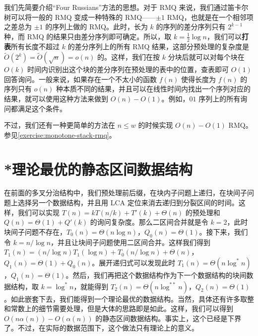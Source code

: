 我们先简要介绍“Four Russians”方法的思想。对于 RMQ 来说，我们通过笛卡尔树可以将一般的 RMQ 变成一种特殊的 RMQ——$\pm 1$ RMQ，也就是在一个相邻项之差总为 $\pm 1$ 的序列上做的 RMQ。此时，长为 $k$ 的序列的差分序列只有 $2^{k-1}$ 种，而 RMQ 的结果只由差分序列即可确定。所以，取 $k=\frac{1}{2}\log n$，我们可以\textbf{打表}所有长度不超过 $k$ 的差分序列上的所有 RMQ 结果，这部分预处理的复杂度是 $\tilde O(2^k)=\tilde O(\sqrt{n})=o(n)$ 的。这样，我们在按 $k$ 分块后就可以对每个块在 $O(k)$ 时间内识别出这个块的差分序列在预处理的表中的位置，查表即可 $O(1)$ 回答询问。一般来说，如果存在一个不太小的函数 $f(n)$ 使得长度为 $f(n)$ 的序列只有 $o(n)$ 种本质不同的结果，并且可以在线性时间内找出一个序列对应的结果，就可以使用这种方法来做到 $O(n)-O(1)$。例如，$01$ 序列上的所有询问都满足这个条件。

不过，我们还有一种更简单的方法在 $n\le w$ 的时候实现 $O(n)-O(1)$ RMQ。参见\cref{exercise:monotone-stack-rmq}。

\section{*理论最优的静态区间数据结构}

在前面的多叉分治结构中，我们预处理前后缀，在块内子问题上递归，在块间子问题上选择另一个数据结构，并且用 LCA 定位来消去递归到分裂区间的时间。这样，我们可以实现 $T(n)=kT(n/k)+T'(k)+\Theta(n)$ 的预处理和 $Q(n)=\Theta(1)+Q'(k)$ 的询问复杂度。那么二区间合并就是令 $k=2$，此时块间子问题不存在，$T_0(n)=\Theta(n\log n)$，$Q_0(n)=\Theta(1)$。接下来，我们令 $k=n/\log n$，并且让块间子问题使用二区间合并。这样我们得到 $T_1(n)=(n/\log n)T_1(\log n)+T_0(n/\log n)+\Theta(n)$，$Q_1(n)=\Theta(1)+Q_0(n)$。展开递归式可以发现此时 $T_1(n)=\Theta(n\log^* n)$，$Q_1(n)=\Theta(1)$。然后，我们再把这个数据结构作为下一个数据结构的块间数据结构，取 $k=\log^* n$，就能得到 $T_2(n)=\Theta(n\log^{**} n)$，$Q_2(n)=\Theta(1)$。如此嵌套下去，我们能得到一个理论最优的数据结构。当然，具体还有许多取整和常数上的细节需要处理，但是大体的思路即是如此。这样，我们可以得到 $O(n\alpha(n))-O(\alpha(n))$ 的静态区间数据结构。事实上，这个已经是下界了。不过，在实际的数据范围下，这个做法只有理论上的意义。

